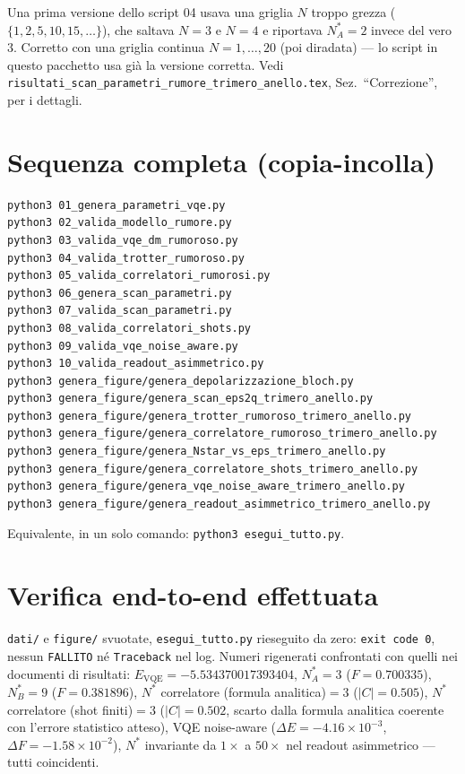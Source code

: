 \documentclass[11pt,a4paper]{article}
\begin{document}
Una prima versione dello script 04 usava una griglia $N$ troppo grezza
($\{1,2,5,10,15,\ldots\}$), che saltava $N=3$ e $N=4$ e riportava
$N^*_A=2$ invece del vero $3$. Corretto con una griglia continua
$N=1,\ldots,20$ (poi diradata) --- lo script in questo pacchetto usa già
la versione corretta. Vedi
\texttt{risultati\_scan\_parametri\_rumore\_trimero\_anello.tex},
Sez.\ ``Correzione'', per i dettagli.

\section{Sequenza completa (copia-incolla)}

\begin{verbatim}
python3 01_genera_parametri_vqe.py
python3 02_valida_modello_rumore.py
python3 03_valida_vqe_dm_rumoroso.py
python3 04_valida_trotter_rumoroso.py
python3 05_valida_correlatori_rumorosi.py
python3 06_genera_scan_parametri.py
python3 07_valida_scan_parametri.py
python3 08_valida_correlatori_shots.py
python3 09_valida_vqe_noise_aware.py
python3 10_valida_readout_asimmetrico.py
python3 genera_figure/genera_depolarizzazione_bloch.py
python3 genera_figure/genera_scan_eps2q_trimero_anello.py
python3 genera_figure/genera_trotter_rumoroso_trimero_anello.py
python3 genera_figure/genera_correlatore_rumoroso_trimero_anello.py
python3 genera_figure/genera_Nstar_vs_eps_trimero_anello.py
python3 genera_figure/genera_correlatore_shots_trimero_anello.py
python3 genera_figure/genera_vqe_noise_aware_trimero_anello.py
python3 genera_figure/genera_readout_asimmetrico_trimero_anello.py
\end{verbatim}
Equivalente, in un solo comando: \texttt{python3 esegui\_tutto.py}.

\section{Verifica end-to-end effettuata}

\texttt{dati/} e \texttt{figure/} svuotate, \texttt{esegui\_tutto.py}
rieseguito da zero: \texttt{exit code 0}, nessun \texttt{FALLITO} n\'e
\texttt{Traceback} nel log. Numeri rigenerati confrontati con quelli nei
documenti di risultati: $E_\text{VQE}=-5.534370017393404$,
$N^*_A=3$ ($F=0.700335$), $N^*_B=9$ ($F=0.381896$), $N^*$
correlatore (formula analitica)$=3$ ($|C|=0.505$), $N^*$ correlatore
(shot finiti)$=3$ ($|C|=0.502$, scarto dalla formula analitica coerente
con l'errore statistico atteso), VQE noise-aware
($\Delta E=-4.16\times10^{-3}$, $\Delta F=-1.58\times10^{-2}$), $N^*$
invariante da $1\times$ a $50\times$ nel readout asimmetrico --- tutti
coincidenti.
\end{document}
